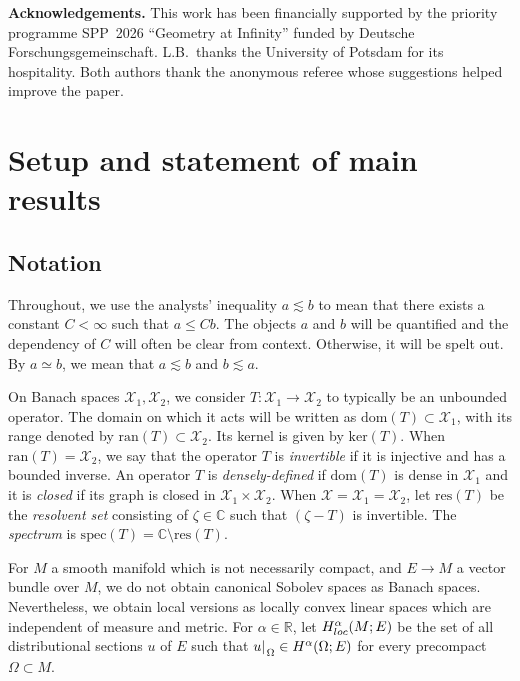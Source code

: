 \documentclass[a4paper,10pt,reqno]{amsart}
\newcommand{\spec}{\mathrm{spec}}%
\newcommand{\res}{\mathrm{res}}%
\newcommand{\rest}[1]{{{\lvert_{}}_{}}_{#1}}
\newcommand{\R}{\mathbb{R}}
\newcommand{\C}{\mathbb{C}}
\newcommand{\Hard}[2][{}]{{\rm H}^{#2}_{\rm #1}}%
\newcommand{\SobH}[2][{}]{\Hard[#1]{\rm #2}}
\newcommand{\Spa}{\mathscr{X}}
\newcommand{\nul}{\mathrm{ker}}
\newcommand{\ran}{\mathrm{ran}}
\newcommand{\dom}{\mathrm{dom}}
\theoremstyle{definition}
\begin{document}
\textbf{Acknowledgements.}
This work has been financially supported by the priority programme SPP~2026 ``Geometry at Infinity'' funded by Deutsche Forschungsgemeinschaft.
L.B.\ thanks the University of Potsdam for its hospitality.
Both authors thank the anonymous referee whose suggestions helped improve the paper.


\section{Setup and statement of main results}

\subsection{Notation}
Throughout, we use the analysts' inequality $a \lesssim b$ to mean that there exists a constant $C < \infty$ such that $a \leq C b$.
The objects $a$ and $b$ will be quantified and the dependency of $C$ will often be clear from context.
Otherwise, it will be spelt out.
By $a \simeq b$, we mean that $a \lesssim b$ and $b \lesssim a$.

On Banach spaces $\Spa_1, \Spa_2$, we consider $T: \Spa_1 \to \Spa_2$ to typically be an unbounded operator.
The domain on which it acts will be written as $\dom(T) \subset \Spa_1$, with its range denoted by $\ran(T) \subset \Spa_2$.
Its kernel is given by $\nul(T)$.
When $\ran(T) = \Spa_2$, we say that the operator $T$ is \emph{invertible} if it is injective and has a bounded inverse.
An operator $T$ is \emph{densely-defined} if $\dom(T)$ is dense in $\Spa_1$ and it is \emph{closed} if its graph is closed in $\Spa_1 \times \Spa_2$.
When $\Spa = \Spa_1 = \Spa_2$, let $\res(T)$ be the \emph{resolvent set} consisting of  $\zeta \in \C$ such that $(\zeta - T)$ is invertible.
The \emph{spectrum} is $\spec(T) = \C \setminus \res(T)$.

For $M$ a smooth manifold which is not necessarily compact, and $E \to M$ a vector bundle over $M$, we do not obtain canonical Sobolev spaces as Banach spaces.
Nevertheless, we obtain local versions as locally convex linear spaces which are independent of measure and metric.
For $\alpha \in \R$, let $\SobH[loc]{\alpha}(M;E)$ be the set of all distributional sections $u$ of $E$ such that $u\rest{\Omega} \in \SobH{\alpha}(\Omega;E)$ for every precompact $\Omega \subset M$.
\end{document}
